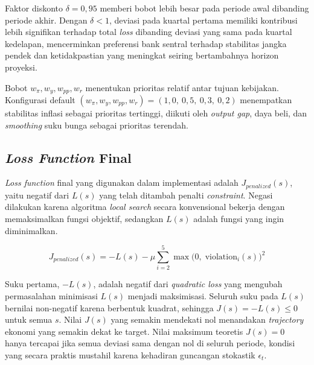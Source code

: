 Faktor diskonto $\delta = 0{,}95$ memberi bobot lebih besar pada periode awal dibanding periode akhir. Dengan $\delta < 1$, deviasi pada kuartal pertama memiliki kontribusi lebih signifikan terhadap total \textit{loss} dibanding deviasi yang sama pada kuartal kedelapan, mencerminkan preferensi bank sentral terhadap stabilitas jangka pendek dan ketidakpastian yang meningkat seiring bertambahnya horizon proyeksi.

Bobot $w_\pi, w_y, w_{pp}, w_r$ menentukan prioritas relatif antar tujuan kebijakan. Konfigurasi default $(w_\pi, w_y, w_{pp}, w_r) = (1{,}0,\ 0{,}5,\ 0{,}3,\ 0{,}2)$ menempatkan stabilitas inflasi sebagai prioritas tertinggi, diikuti oleh \textit{output gap}, daya beli, dan \textit{smoothing} suku bunga sebagai prioritas terendah.

\subsection{\textit{Loss Function} Final}

\textit{Loss function} final yang digunakan dalam implementasi adalah $J_{penalized}(s)$, yaitu negatif dari $L(s)$ yang telah ditambah penalti \textit{constraint}. Negasi dilakukan karena algoritma \textit{local search} secara konvensional bekerja dengan memaksimalkan fungsi objektif, sedangkan $L(s)$ adalah fungsi yang ingin diminimalkan.

\[
    J_{penalized}(s) = -L(s) - \mu \sum_{i=2}^{5} \max\!\big(0,\; \text{violation}_i(s)\big)^2
\]

Suku pertama, $-L(s)$, adalah negatif dari \textit{quadratic loss} yang mengubah permasalahan minimisasi $L(s)$ menjadi maksimisasi. Seluruh suku pada $L(s)$ bernilai non-negatif karena berbentuk kuadrat, sehingga $J(s) = -L(s) \leq 0$ untuk semua $s$. Nilai $J(s)$ yang semakin mendekati nol menandakan \textit{trajectory} ekonomi yang semakin dekat ke target. Nilai maksimum teoretis $J(s) = 0$ hanya tercapai jika semua deviasi sama dengan nol di seluruh periode, kondisi yang secara praktis mustahil karena kehadiran guncangan stokastik $\epsilon_t$.

